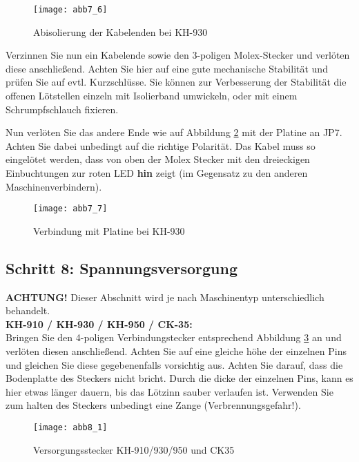 \documentclass[fleqn,10pt]{SelfArx} %
\begin{document}
\begin{figure}[tbhp]\centering
\texttt{[image: abb7\_6]}
\caption{Abisolierung der Kabelenden bei KH-930}
\label{fig:abb7_6}
\end{figure}

Verzinnen Sie nun ein Kabelende sowie den 3-poligen Molex-Stecker und verlöten diese anschließend. Achten Sie hier auf eine gute mechanische Stabilität und prüfen Sie auf evtl. Kurzschlüsse. Sie können zur Verbesserung der Stabilität die offenen Lötstellen einzeln mit Isolierband umwickeln, oder mit einem Schrumpfschlauch fixieren.

Nun verlöten Sie das andere Ende wie auf Abbildung \ref{fig:abb7_7} mit der Platine an JP7. Achten Sie dabei unbedingt auf die richtige Polarität. Das Kabel muss so eingelötet werden, dass von oben der Molex Stecker mit den dreieckigen Einbuchtungen zur roten LED \textbf{hin} zeigt (im Gegensatz zu den anderen Maschinenverbindern).

\begin{figure}[tbhp]\centering
\texttt{[image: abb7\_7]}
\caption{Verbindung mit Platine bei KH-930}
\label{fig:abb7_7}
\end{figure}

\FloatBarrier

 \subsection*{Schritt 8: Spannungsversorgung}

\textbf{ACHTUNG!} Dieser Abschnitt wird je nach Maschinentyp unterschiedlich behandelt.\\

\textbf{KH-910 / KH-930 / KH-950 / CK-35:} \\

Bringen Sie den 4-poligen Verbindungstecker entsprechend Abbildung \ref{fig:abb8_1} an und verlöten diesen anschließend. Achten Sie auf eine gleiche höhe der einzelnen Pins und gleichen Sie diese gegebenenfalls vorsichtig aus. Achten Sie darauf, dass die Bodenplatte des Steckers nicht bricht. Durch die dicke der einzelnen Pins, kann es hier etwas länger dauern, bis das Lötzinn sauber verlaufen ist. Verwenden Sie zum halten des Steckers unbedingt eine Zange (Verbrennungsgefahr!).

\begin{figure}[tbhp]\centering
\texttt{[image: abb8\_1]}
\caption{Versorgungsstecker KH-910/930/950 und CK35}
\label{fig:abb8_1}
\end{figure}
\end{document}
